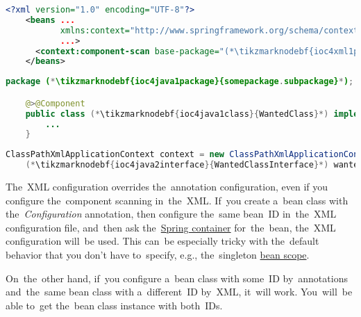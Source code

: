 \begin{lstlisting}[language=XML, title={Configuration XML}]
    <?xml version="1.0" encoding="UTF-8"?>
    <beans ...
           xmlns:context="http://www.springframework.org/schema/context"
           ...>
      <context:component-scan base-package="(*\tikzmarknodebf{ioc4xml1package}{somepackage.subpackage}[ForestGreen]*)"/>
    </beans>
\end{lstlisting}
\begin{lstlisting}[language=Java, title={Wanted class}]
    package (*\tikzmarknodebf{ioc4java1package}{somepackage.subpackage}*);

    @>@Component
    public class (*\tikzmarknodebf{ioc4java1class}{WantedClass}*) implements (*\tikzmarknodebf{ioc4java1interface}{WantedClassInterface}*) {
        ...
    }
\end{lstlisting}
\begin{lstlisting}[language=Java, title={Usage}]
    ClassPathXmlApplicationContext context = new ClassPathXmlApplicationContext("configurationFile.xml");
    (*\tikzmarknodebf{ioc4java2interface}{WantedClassInterface}*) wantedClassInstance = context.getBean("(*\tikzmarknodebf{ioc4java2beanid}{wantedClass}[ForestGreen]*)", (*\tikzmarknodebf{ioc4java2interface2}{WantedClassInterface}*).class);
\end{lstlisting}

\warningnonl The~XML configuration overrides the~annotation configuration, even if you configure the~component scanning in~the~XML.
If~you create a~bean class with the~\textit{Configuration} annotation, then configure the~same bean~ID in~the~XML configuration file, and~then ask the~\hyperref[springcontainrer]{Spring container} for~the~bean, the~XML configuration will~be used.
This can~be especially tricky with the~default behavior that you don't have to~specify, e.g., the~singleton \hyperref[beanscope]{bean scope}.

On~the~other hand, if~you configure a~bean class with some~ID by~annotations and~the~same bean class with a~different~ID by~XML, it~will work.
You~will~be able to~get the~bean class instance with both~IDs.

